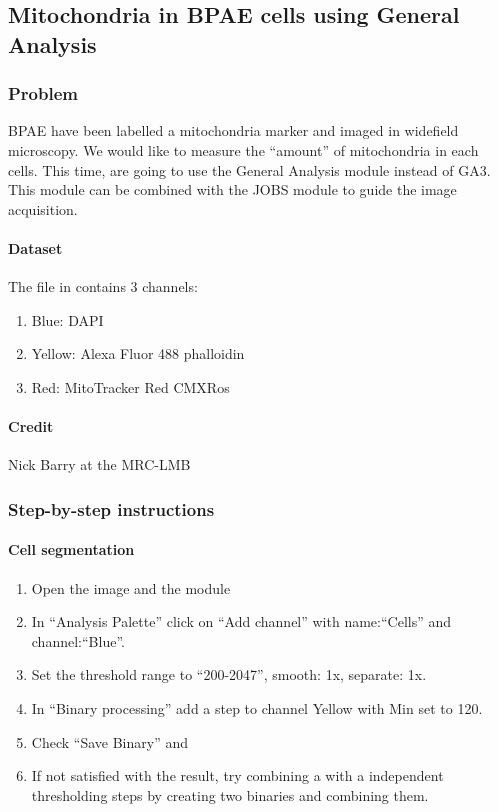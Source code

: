 \subsection{Mitochondria in BPAE cells using General Analysis} \label{sec:bpae-mitochondria}

\subsubsection*{Problem}
BPAE have been labelled a mitochondria marker and imaged in widefield microscopy. We would like to measure the ``amount'' of mitochondria in each cells. This time, are going to use the General Analysis module instead of GA3. This module can be combined with the JOBS module to guide the image acquisition.

\paragraph{Dataset} The file in  contains 3 channels:
\begin{enumerate}
    \item Blue: DAPI
    \item Yellow: Alexa Fluor 488 phalloidin
    \item Red: MitoTracker Red CMXRos
\end{enumerate}

\paragraph{Credit} Nick Barry at the MRC-LMB

\subsubsection*{Step-by-step instructions}
\paragraph{Cell segmentation}
\begin{enumerate}
    \item Open the image  and the module 
    \item In ``Analysis Palette'' click on ``Add channel'' with name:``Cells'' and channel:``Blue''.
    \item Set the threshold range to ``200-2047'', smooth: 1x, separate: 1x.
    \item In ``Binary processing'' add a step  to channel Yellow with Min set to 120.
    \item Check ``Save Binary'' and 
    \item If not satisfied with the result, try combining a  with a independent thresholding steps by creating two binaries and combining them.
\end{enumerate}

